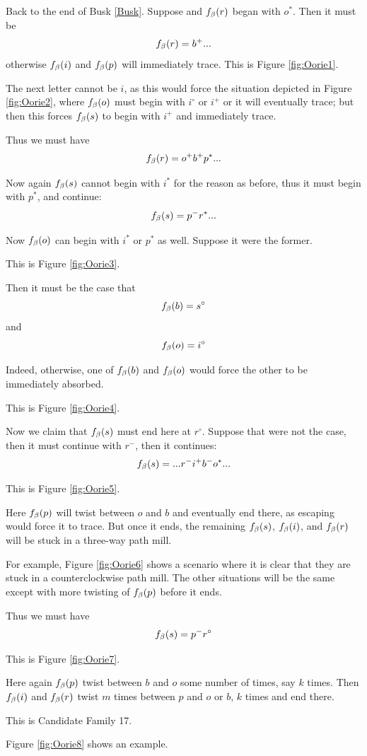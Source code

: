 \label{Oorie}
Back to the end of Busk \ref{Busk}. Suppose and $f_\beta(r)$ began with $o^*$. Then it must be 
$$f_\beta(r) = b^+...$$
otherwise $f_\beta(i)$ and $f_\beta(p)$ will immediately trace.  This is Figure \ref{fig:Oorie1}.

The next letter cannot be $i$, as this would force the situation depicted in Figure \ref{fig:Oorie2}, where $f_\beta(o)$ must begin with $i^\circ$ or $i^+$ or it will eventually trace; but then this forces $f_\beta(s)$ to begin with $i^+$ and immediately trace.

Thus we must have
$$f_\beta(r) = o^+ b^+ p^*...$$

Now again $f_\beta(s)$ cannot begin with $i^*$ for the reason as before, thus it must begin with $p^*$, and continue:
$$f_\beta(s) = p^- r^*...$$

Now $f_\beta(o)$ can begin with $i^*$ or $p^*$ as well. Suppose it were the former. 

This is Figure \ref{fig:Oorie3}.

Then it must be the case that 
$$f_\beta(b) = s^\circ$$
and
$$f_\beta(o) = i^\circ$$

Indeed, otherwise, one of $f_\beta(b)$ and $f_\beta(o)$ would force the other to be immediately absorbed.

This is Figure \ref{fig:Oorie4}.

Now we claim that $f_\beta(s)$ must end here at $r^\circ$. Suppose that were not the case, then it must continue with $r^-$, then it continues:
$$f_\beta(s) = ...r^- i^+ b^- o^*...$$

This is Figure \ref{fig:Oorie5}.

Here $f_\beta(p)$ will twist between $o$ and $b$ and eventually end there, as escaping would force it to trace. But once it ends, the remaining $f_\beta(s)$, $f_\beta(i)$, and $f_\beta(r)$ will be stuck in a three-way path mill. 

For example, Figure \ref{fig:Oorie6} shows a scenario where it is clear that they are stuck in a counterclockwise path mill. The other situations will be the same except with more twisting of $f_\beta(p)$ before it ends.

Thus we must have
$$f_\beta(s) = p^- r^\circ$$

This is Figure \ref{fig:Oorie7}.

Here again $f_\beta(p)$ twist between $b$ and $o$ some number of times, say $k$ times. Then $f_\beta(i)$ and $f_\beta(r)$ twist $m$ times between $p$ and $o$ or $b$, $k$ times and end there.

This is Candidate Family 17.

Figure \ref{fig:Oorie8} shows an example.

